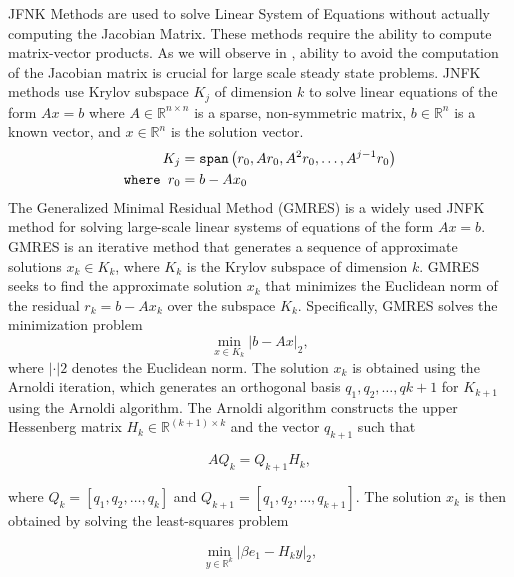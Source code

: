 JFNK Methods are used to solve Linear System of Equations without actually computing the Jacobian Matrix. These methods require the ability to compute matrix-vector products. As we will observe in , ability to avoid the computation of the Jacobian matrix is crucial for large scale steady state problems. JNFK methods use Krylov subspace $K_j$ of dimension $k$ to solve linear equations of the form $A x = b$  where $A \in \mathbb{R}^{n \times n}$ is a sparse, non-symmetric matrix, $b \in \mathbb{R}^n$ is a known vector, and $x \in \mathbb{R}^n$ is the solution vector.
%
\begin{align}
  K_j                 & = \texttt{span}\left(r_0, Ar_0, A^2 r_0, \dots, A^{j-1} r_0\right)\label{eq:krylov_subspace} \\
  \texttt{where } r_0 & = b - A x_0
\end{align}
%
The Generalized Minimal Residual Method (GMRES) is a widely used JNFK method for solving large-scale linear systems of equations of the form $Ax=b$. GMRES is an iterative method that generates a sequence of approximate solutions $x_k \in K_k$, where $K_k$ is the Krylov subspace of dimension $k$. GMRES seeks to find the approximate solution $x_k$ that minimizes the Euclidean norm of the residual $r_k = b - Ax_k$ over the subspace $K_k$. Specifically, GMRES solves the minimization problem
%
\begin{equation}
  \min_{x \in K_k} |b - Ax|_2,
\end{equation}
%
where $| \cdot |2$ denotes the Euclidean norm. The solution $x_k$ is obtained using the Arnoldi iteration, which generates an orthogonal basis ${q_1, q_2, \dots, q{k+1}}$ for $K_{k+1}$ using the Arnoldi algorithm. The Arnoldi algorithm constructs the upper Hessenberg matrix $H_k \in \mathbb{R}^{(k+1) \times k}$ and the vector $q_{k+1}$ such that

\begin{equation}
  AQ_k = Q_{k+1} H_k,
\end{equation}

where $Q_k = [q_1, q_2, \dots, q_k]$ and $Q_{k+1} = [q_1, q_2, \dots, q_{k+1}]$. The solution $x_k$ is then obtained by solving the least-squares problem

\begin{equation}
  \min_{y \in \mathbb{R}^k} | \beta e_1 - H_k y |_2,
\end{equation}

